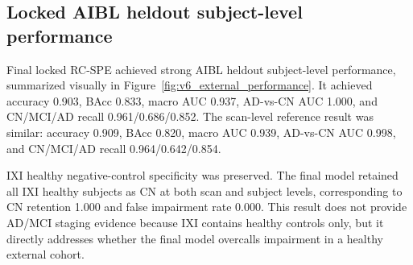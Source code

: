 \subsection{Locked AIBL heldout subject-level performance}
\label{sec:external_results}

Final locked RC-SPE achieved strong AIBL heldout subject-level performance, summarized visually in Figure~\ref{fig:v6_external_performance}. It achieved accuracy 0.903, BAcc 0.833, macro AUC 0.937, AD-vs-CN AUC 1.000, and CN/MCI/AD recall 0.961/0.686/0.852. The scan-level reference result was similar: accuracy 0.909, BAcc 0.820, macro AUC 0.939, AD-vs-CN AUC 0.998, and CN/MCI/AD recall 0.964/0.642/0.854.

IXI healthy negative-control specificity was preserved. The final model retained all IXI healthy subjects as CN at both scan and subject levels, corresponding to CN retention 1.000 and false impairment rate 0.000. This result does not provide AD/MCI staging evidence because IXI contains healthy controls only, but it directly addresses whether the final model overcalls impairment in a healthy external cohort.

